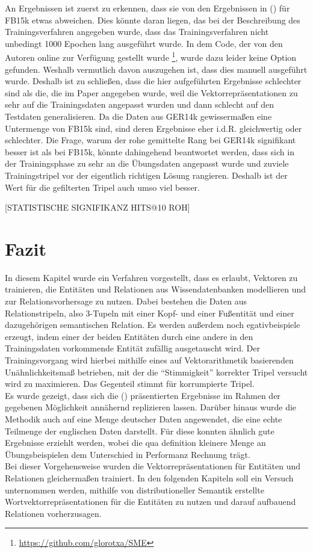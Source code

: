 An Ergebnissen ist zuerst zu erkennen, dass sie von den Ergebnissen in (\cite{bordes2013translating}) für FB15k etwas abweichen.
Dies könnte daran liegen, das bei der Beschreibung des Trainingsverfahren angegeben wurde, dass das Trainingsverfahren
nicht unbedingt 1000 Epochen lang ausgeführt wurde. In dem Code, der von den Autoren online zur Verfügung gestellt wurde
\footnote{\url{https://github.com/glorotxa/SME}}, wurde dazu leider keine Option gefunden. Weshalb vermutlich davon auszugehen
ist, dass dies manuell ausgeführt wurde. Deshalb ist zu schließen, dass die hier aufgeführten Ergebnisse schlechter sind als die,
die im Paper angegeben wurde, weil die Vektorrepräsentationen zu sehr auf die Trainingsdaten angepasst wurden und dann schlecht
auf den Testdaten generalisieren. Da die Daten aus GER14k gewissermaßen eine Untermenge von FB15k sind, sind deren Ergebnisse
eher i.d.R. gleichwertig oder schlechter. Die Frage, warum der rohe gemittelte Rang bei GER14k signifikant besser ist als
bei FB15k, könnte dahingehend beantwortet werden, dass sich in der Trainingsphase zu sehr an die Übungsdaten angepasst wurde und
zuviele Trainingstripel vor der eigentlich richtigen Lösung rangieren. Deshalb ist der Wert für die gefilterten Tripel auch umso viel
besser.

[STATISTISCHE SIGNIFIKANZ HITS@10 ROH]

\section{Fazit}

In diesem Kapitel wurde ein Verfahren vorgestellt, dass es erlaubt, Vektoren zu trainieren, die Entitäten und Relationen
aus Wissendatenbanken modellieren und zur Relationsvorhersage zu nutzen. Dabei bestehen die Daten aus Relationstripeln,
also 3-Tupeln mit einer Kopf- und einer Fußentität und einer dazugehörigen semantischen Relation. Es werden außerdem noch
 egativbeispiele erzeugt, indem einer der beiden Entitäten durch eine andere in den Trainingsdaten vorkommende Entität zufällig ausgetauscht wird.
Der Trainingsvorgang wird hierbei mithilfe eines auf Vektorarithmetik basierenden Unähnlichkeitsmaß betrieben, mit der
die ``Stimmigkeit'' korrekter Tripel versucht wird zu maximieren. Das Gegenteil stimmt für korrumpierte Tripel.\\
Es wurde gezeigt, dass sich die (\cite{bordes2011learning}) präsentierten Ergebnisse im Rahmen der gegebenen Möglichkeit
annähernd replizieren lassen. Darüber hinaus wurde die Methodik auch auf eine Menge deutscher Daten angewendet, die eine
echte Teilmenge der englischen Daten darstellt. Für diese konnten ähnlich gute Ergebnisse erziehlt werden, wobei die qua
definition kleinere Menge an Übungsbeispielen dem Unterschied in Performanz Rechnung trägt.\\

Bei dieser Vorgehensweise wurden die Vektorrepräsentationen für Entitäten und Relationen gleichermaßen trainiert. In den folgenden
Kapiteln soll ein Versuch unternommen werden, mithilfe von distributioneller Semantik erstellte Wortvektorrepräsentationen
für die Entitäten zu nutzen und darauf aufbauend Relationen vorherzusagen.
